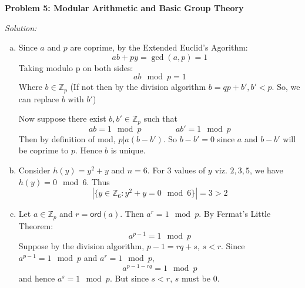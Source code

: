 \documentclass[a4paper, 11pt]{article}
\newenvironment{solution}
    {\textit{Solution:}}
    {\clearpage}
\newcommand{\prob}[1]{\begin{mdframed}[backgroundcolor=gray!20] \textbf{Problem #1}\end{mdframed}}
\newcommand{\ord}{\mathsf{ord}}
\newcommand{\Z}{\mathbb{Z}}
\begin{document}
\prob{5: Modular Arithmetic and Basic Group Theory}
\begin{solution}
    \begin{enumerate}[(a)]
        \item Since $a$ and $p$ are coprime, by the Extended Euclid's Agorithm:
              $$ ab+py=\gcd(a,p)=1    $$
              Taking modulo p on both sides:
              $$ ab \mod p =1    $$
              Where $b\in\Z_p$ (If not then by the division algorithm $b=qp+b', b'<p$. So, we can replace $b$ with $b'$)
              \vspace{20pt}

              Now suppose there exist $b, b'\in\Z_p$ such that
              $$ ab=1\mod p \hspace{50pt} ab'=1\mod p    $$
              Then by definition of mod, $p|a(b-b')$. So $b-b'=0$ since $a$ and $b-b'$ will be coprime to $p$. Hence $b$ is unique.

        \item Consider $h(y)=y^2+y$ and $n=6$. For 3 values of $y$ viz. $2,3,5$, we have $h(y)=0\mod 6$. Thus
              $$|\{y\in\Z_6:y^2+y=0\mod6\}|=3>2$$

        \item Let $a\in\Z_p$ and $r=\ord(a)$. Then $a^r=1\mod p$. By Fermat's Little Theorem:
              $$a^{p-1}=1\mod p$$
              Suppose by the division algorithm, $p-1=rq+s$, $s<r$. Since $a^{p-1}=1\mod p$ and $a^{r}=1\mod p$, $$a^{p-1-rq}=1\mod p$$ and hence $a^{s}=1\mod p$. But since $s<r$, $s$ must be 0.
    \end{enumerate}
\end{solution}
\end{document}
